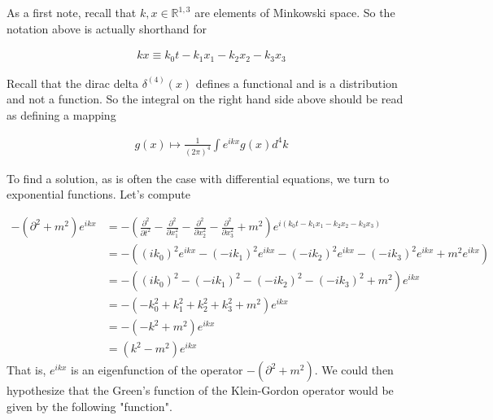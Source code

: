 \documentclass[book.tex]{subfiles}
\begin{document}

As a first note, recall that $k,x  \in \mathbb{R}^{1,3}$ are elements of Minkowski space. So the notation above is actually shorthand for

\begin{align}
    kx \equiv k_0 t - k_1 x_1 - k_2 x_2 - k_3 x_3
\end{align}

Recall that the dirac delta $\delta^{(4)}(x)$ defines a functional and is a distribution and not a function. So the integral on the right hand side above should be read as defining a mapping

\begin{align}
    g(x) \mapsto \frac{1}{(2\pi)^4} \int e^{ikx} g(x) d^4 k
\end{align}


To find a solution, as is often the case with differential equations, we turn to exponential functions. Let's compute

\begin{align}
-(\partial^2 + m^2 ) e^{ikx} &= -\left (\frac{\partial^2}{\partial t^2} - \frac{\partial^2}{\partial x_1^2} - \frac{\partial^2}{\partial x_2^2} - \frac{\partial^2}{\partial x_3^2}  + m^2 \right ) e^{i(k_0t - k_1x_1 - k_2x_2 - k_3x_3)}  \\
&= -\left ((ik_0)^2e^{ikx} - (-ik_1)^2e^{ikx} - (-ik_2)^2 e^{ikx} - (-ik_3)^2 e^{ikx} + m^2 e^{ikx}\right ) \\
&= -((ik_0)^2 - (-ik_1)^2 - (-ik_2)^2  - (-ik_3)^2 +m^2)e^{ikx} \\
&= -(-k_0^2 + k_1^2 + k_2^2  + k_3^2 + m^2)e^{ikx} \\
&= -(-k^2 + m^2)e^{ikx} \\
&= (k^2 - m^2)e^{ikx} 
\end{align}
That is, $e^{ikx}$ is an eigenfunction of the operator $-(\partial^2 + m^2)$. We could then hypothesize that the Green's function of the Klein-Gordon operator would be given by the following "function".
\end{document}
